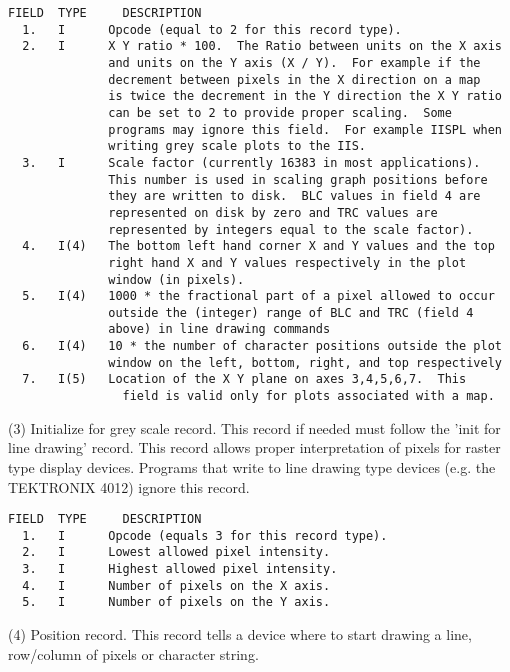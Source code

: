 \begin{verbatim}
FIELD  TYPE     DESCRIPTION
  1.   I      Opcode (equal to 2 for this record type).
  2.   I      X Y ratio * 100.  The Ratio between units on the X axis
              and units on the Y axis (X / Y).  For example if the
              decrement between pixels in the X direction on a map
              is twice the decrement in the Y direction the X Y ratio
              can be set to 2 to provide proper scaling.  Some
              programs may ignore this field.  For example IISPL when
              writing grey scale plots to the IIS.
  3.   I      Scale factor (currently 16383 in most applications).
              This number is used in scaling graph positions before
              they are written to disk.  BLC values in field 4 are
              represented on disk by zero and TRC values are
              represented by integers equal to the scale factor).
  4.   I(4)   The bottom left hand corner X and Y values and the top
              right hand X and Y values respectively in the plot
              window (in pixels).
  5.   I(4)   1000 * the fractional part of a pixel allowed to occur
              outside the (integer) range of BLC and TRC (field 4
              above) in line drawing commands
  6.   I(4)   10 * the number of character positions outside the plot
              window on the left, bottom, right, and top respectively
  7.   I(5)   Location of the X Y plane on axes 3,4,5,6,7.  This
                field is valid only for plots associated with a map.
\end{verbatim}
 
(3)  Initialize for grey scale record.
   This record if needed must follow the 'init for line drawing'
record.  This record allows proper interpretation of pixels for
raster type display devices.  Programs that write to line drawing
type devices (e.g. the TEKTRONIX 4012) ignore this record.
 
\begin{verbatim}
FIELD  TYPE     DESCRIPTION
  1.   I      Opcode (equals 3 for this record type).
  2.   I      Lowest allowed pixel intensity.
  3.   I      Highest allowed pixel intensity.
  4.   I      Number of pixels on the X axis.
  5.   I      Number of pixels on the Y axis.
\end{verbatim}

 
 
(4)  Position record.
    This record tells a device where to start drawing a line,
row/column of pixels or character string.
 
